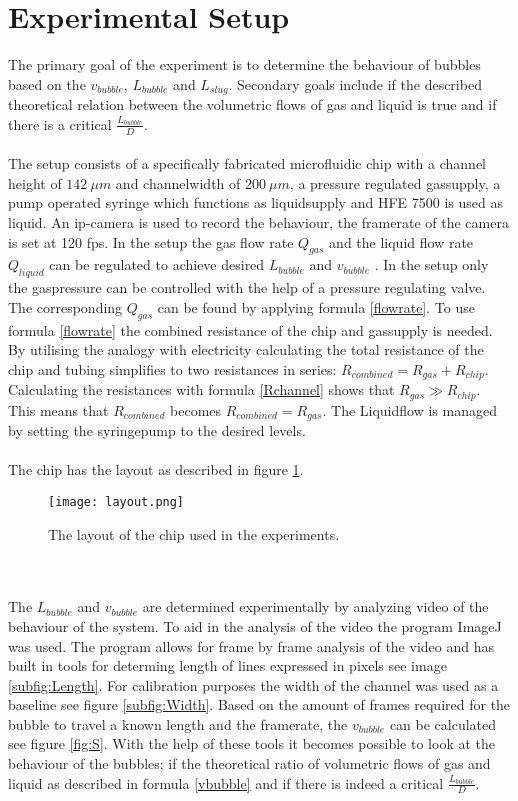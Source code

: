 \section{Experimental Setup}
\label{expsetup}
The primary goal of the experiment is to determine the behaviour of bubbles based on the $v_{bubble}$, $L_{bubble}$ and $L_{slug}$. Secondary goals include if the described theoretical relation between the volumetric flows of gas and liquid is true and if there is a critical $\frac{L_{bubble}}{D}$. \\
\\
The setup consists of a specifically fabricated microfluidic chip with a channel height of  $142 ~\mu m$ and channelwidth of $200~ \mu m$, a pressure regulated gassupply, a pump operated syringe which functions as liquidsupply and HFE 7500 is used as liquid. An ip-camera is used to record the behaviour, the framerate of the camera is set at 120 fps. In the setup the gas flow rate $Q_{gas}$ and the liquid flow rate $Q_{liquid}$ can be regulated to achieve desired $L_{bubble}$ and $v_{bubble}$ . In the setup only the gaspressure can be controlled with the help of a pressure regulating valve. The corresponding $Q_{gas}$ can be found by applying formula \ref{flowrate}. To use formula \ref{flowrate} the combined resistance of the chip and gassupply is needed. By utilising the analogy with electricity calculating the total resistance of the chip and tubing simplifies to two resistances in series: $R_{combined} =R_{gas}+R_{chip}$. Calculating the resistances with formula \ref{Rchannel} shows that $R_{gas}\gg R_{chip}$. This means that $R_{combined}$ becomes  $R_{combined}=R_{gas}$. The Liquidflow is managed by setting the syringepump to the desired levels.\\
\\
The chip has the layout as described in figure \ref{fig:layout}.\
\begin{figure}[ht]
\centering
\texttt{[image: layout.png]}
\caption{The layout of the chip used in the experiments.\cite{handout}}
\label{fig:layout}
\end{figure}
\\
\\
The $L_{bubble}$ and $v_{bubble}$ are determined experimentally by analyzing video of the behaviour of the system. To aid in the analysis of the video the program ImageJ was used. The program allows for frame by frame analysis of the video and has built in tools for determing length of lines expressed in pixels see image \ref{subfig:Length}. For calibration purposes the width of the channel was used as a baseline see figure \ref{subfig:Width}. Based on the amount of frames required for the bubble to travel a known length and the framerate, the $v_{bubble}$ can be calculated see figure \ref{fig:S}. With the help of these tools it becomes possible to look at the behaviour of the bubbles; if the theoretical ratio of volumetric flows of gas and liquid as described in formula \ref{vbubble} and if there is indeed a critical $\frac{L_{bubble}}{D}$.

